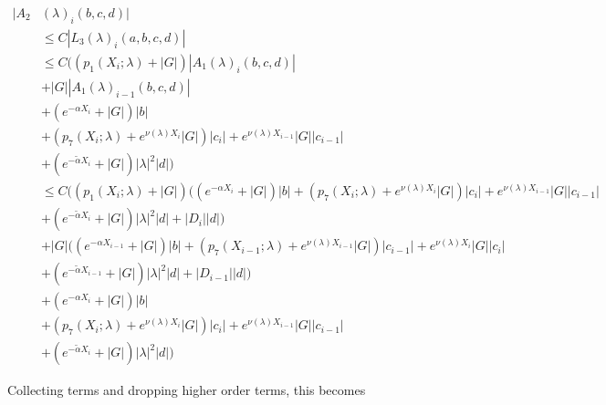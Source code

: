 \documentclass[12pt]{article}
\begin{document}
\begin{enumerate}
\begin{align*}
|A_2&(\lambda)_i(b, c, d)| \\
&\leq C |L_3(\lambda)_i(a, b, c, d)| \\
&\leq C \Big( (p_1(X_i; \lambda) + |G|)|A_1(\lambda)_i(b, c, d)| \\
&+ |G||A_1(\lambda)_{i-1}(b, c, d)| \\
&+ (e^{-\alpha X_i} + |G|) |b| \\
&+ ( p_7(X_i; \lambda) + e^{\nu(\lambda)X_i} |G|) |c_i| + e^{\nu(\lambda)X_{i-1}} |G| |c_{i-1}| \\
&+ (e^{-\tilde{\alpha} X_i} + |G|) |\lambda|^2 |d| \Big) \\
&\leq C \Big( (p_1(X_i; \lambda) + |G|) ((e^{-\alpha X_i} + |G|) |b| 
+ ( p_7(X_i; \lambda) + e^{\nu(\lambda)X_i} |G|) |c_i| + e^{\nu(\lambda)X_{i-1}} |G| |c_{i-1}| \\
&+ (e^{-\tilde{\alpha} X_i} + |G|) |\lambda|^2 |d| + |D_i||d| )\\
&+ |G|((e^{-\alpha X_{i-1}} + |G|) |b| 
+ ( p_7(X_{i-1}; \lambda) + e^{\nu(\lambda)X_{i-1}} |G|) |c_{i-1}| + e^{\nu(\lambda)X_i} |G| |c_i| \\
&+ (e^{-\tilde{\alpha} X_{i-1}} + |G|) |\lambda|^2 |d| + |D_{i-1}||d| ) \\
&+ (e^{-\alpha X_i} + |G|) |b| \\
&+ ( p_7(X_i; \lambda) + e^{\nu(\lambda)X_i} |G|) |c_i| + e^{\nu(\lambda)X_{i-1}} |G| |c_{i-1}| \\
&+ (e^{-\tilde{\alpha} X_i} + |G|) |\lambda|^2 |d| \Big)
\end{align*} 

Collecting terms and dropping higher order terms, this becomes


\end{enumerate}
\end{document}
